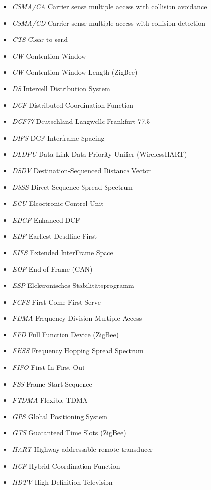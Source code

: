 \documentclass{article}
\begin{document}
\begin{itemize}
	\item \emph{CSMA/CA} Carrier sense multiple access with collision avoidance
	\item \emph{CSMA/CD} Carrier sense multiple access with collision detection
	\item \emph{CTS} Clear to send
	\item \emph{CW} Contention Window
	\item \emph{CW} Contention Window Length (ZigBee)
	\item \emph{DS} Intercell Distribution System
	\item \emph{DCF} Distributed Coordination Function
	\item \emph{DCF77} Deutschland-Langwelle-Frankfurt-77,5
	\item \emph{DIFS} DCF Interframe Spacing
	\item \emph{DLDPU} Data Link Data Priority Unifier (WirelessHART)
	\item \emph{DSDV} Destination-Sequenced Distance Vector
	\item \emph{DSSS} Direct Sequence Spread Spectrum
	\item \emph{ECU} Eleoctronic Control Unit
	\item \emph{EDCF} Enhanced DCF
	\item \emph{EDF} Earliest Deadline First
	\item \emph{EIFS} Extended InterFrame Space
	\item \emph{EOF} End of Frame (CAN)
	\item \emph{ESP} Elektronisches Stabilitätsprogramm
	\item \emph{FCFS} First Come First Serve
	\item \emph{FDMA} Frequency Division Multiple Access
	\item \emph{FFD} Full Function Device (ZigBee)
	\item \emph{FHSS} Frequency Hopping Spread Spectrum
	\item \emph{FIFO} First In First Out
	\item \emph{FSS} Frame Start Sequence
	\item \emph{FTDMA} Flexible TDMA
	\item \emph{GPS} Global Positioning System
	\item \emph{GTS} Guaranteed Time Slots (ZigBee)
	\item \emph{HART} Highway addressable remote transducer
	\item \emph{HCF} Hybrid Coordination Function
	\item \emph{HDTV} High Definition Television

\end{itemize}
\end{document}
